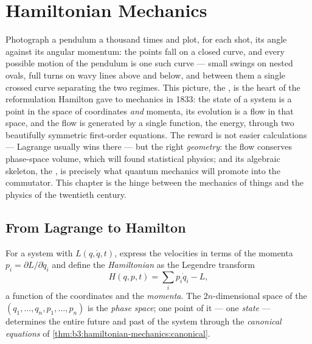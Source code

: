 \chapter{Hamiltonian Mechanics}\label{ch:b3:hamiltonian-mechanics}

Photograph a pendulum a thousand times and plot, for each shot, its
angle against its angular momentum: the points fall on a closed curve,
and every possible motion of the pendulum is one such curve --- small
swings on nested ovals, full turns on wavy lines above and below, and
between them a single crossed curve separating the two regimes. This
picture, the \emph{}, is the heart of the reformulation
Hamilton gave to mechanics in 1833: the state of a system is a point
in the space of coordinates \emph{and} momenta, its evolution is a
flow in that space, and the flow is generated by a single function,
the energy, through two beautifully symmetric first-order equations.
The reward is not easier calculations --- Lagrange usually wins there
--- but the right \emph{geometry}: the flow conserves phase-space
volume, which will found statistical physics; and its algebraic
skeleton, the , is precisely what quantum mechanics
will promote into the commutator. This chapter is the hinge between
the mechanics of things and the physics of the twentieth century.

\section{From Lagrange to Hamilton}

\begin{definition}\label{def:b3:hamiltonian-mechanics:hamiltonian}
For a system with  $L(q, \dot q, t)$, express the velocities
in terms of the momenta $p_i = \partial L/\partial\dot q_i$ and define
the \emph{Hamiltonian} as the Legendre transform
\[
H(q, p, t) = \sum_i p_i\dot q_i - L ,
\]
a function of the coordinates and the \emph{momenta}. The
$2n$-dimensional space of the $(q_1, \dots, q_n, p_1, \dots, p_n)$ is
the \emph{phase space}; one point of it --- one \emph{state} ---
determines the entire future and past of the system through the
\emph{canonical equations} of
\cref{thm:b3:hamiltonian-mechanics:canonical}.
\end{definition}

